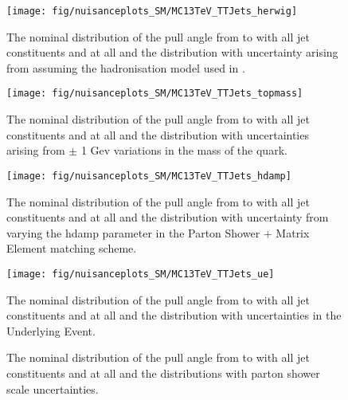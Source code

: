 \begin{figure}[hbtp]
  \centering
  \def\twidth{0.45}
  \texttt{[image: fig/nuisanceplots\_SM/MC13TeV\_TTJets\_herwig]}
  \caption{The nominal distribution of the pull angle from \leadingjet to \scndleadingjet with all jet constituents and at all \DeltaR and the distribution with uncertainty arising from assuming the hadronisation model used in \HERWIGpp.}
  \label{fig:MC13TeV_TTJets_herwig}
\end{figure}

\begin{figure}[hbtp]
  \centering
  \def\twidth{0.45}
  \texttt{[image: fig/nuisanceplots\_SM/MC13TeV\_TTJets\_topmass]}
  \caption{The nominal distribution of the pull angle from \leadingjet to \scndleadingjet with all jet constituents and at all \DeltaR and the distribution with uncertainties arising from $\pm$ 1 Gev variations in the mass of the \cPqt quark.}
  \label{fig:MC13TeV_TTJets_topmass}
\end{figure}

\begin{figure}[hbtp]
  \centering
  \def\twidth{0.45}
  \texttt{[image: fig/nuisanceplots\_SM/MC13TeV\_TTJets\_hdamp]}
  \caption{The nominal distribution of the pull angle from \leadingjet to \scndleadingjet with all jet constituents and at all \DeltaR and the distribution with uncertainty from varying the hdamp parameter in the Parton Shower + Matrix Element matching scheme.}
  \label{fig:MC13TeV_TTJets_hdamp}
\end{figure}

\begin{figure}[hbtp]
  \def\twidth{0.45}
  \centering
  \texttt{[image: fig/nuisanceplots\_SM/MC13TeV\_TTJets\_ue]}
  \caption{The nominal distribution of the pull angle from \leadingjet to \scndleadingjet with all jet constituents and at all \DeltaR and the distribution with uncertainties in the Underlying Event.}
  \label{fig:MC13TeV_TTJets_ue}
\end{figure}

\begin{figure}[hbtp]
  \def\twidth{0.45}
  \centering

  \caption{The nominal distribution of the pull angle from \leadingjet to \scndleadingjet with all jet constituents and at all \DeltaR and the distributions with parton shower scale uncertainties.}
  \label{fig:MC13TeV_TTJets_PS}
\end{figure}

